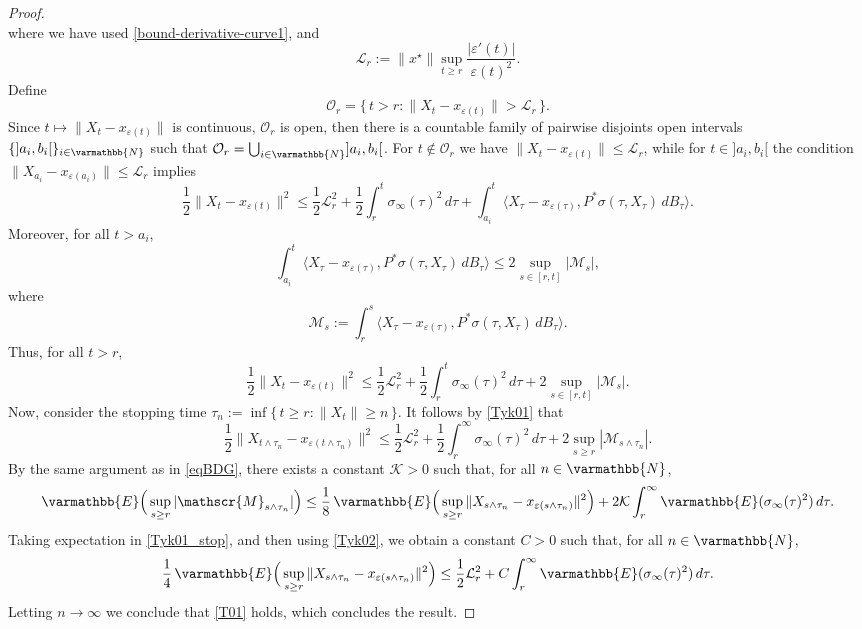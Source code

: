 \documentclass[11pt,reqno]{article}
\let\mathbb=\varmathbb
\newcommand{\N}{\mathbb{N}}
\renewcommand{\epsilon}{\varepsilon}
\newcommand{\1}{\mathds{1}}
\numberwithin{equation}{section}  %
\theoremstyle{plain}
\theoremstyle{definition}
\theoremstyle{remark}
\numberwithin{theorem}{section}
\numberwithin{remark}{section}
\numberwithin{example}{section}
\begin{document}
\begin{proof}
\begin{equation*}
	\end{equation*}
	where we have used \eqref{bound-derivative-curve1}, and
	\[
	\mathcal{L}_{r} := \|x^\star\| \sup_{t\geq r}\frac{|\epsilon'(t)|}{\epsilon(t)^2}.
	\]
	Define
	\[
	\mathcal{O}_r= \{\,t>r : \|X_t-x_{\epsilon(t)}\| > \mathcal{L}_{r} \,\}.
	\]
	Since $t \mapsto \|X_t-x_{\epsilon(t)}\|$ is continuous, $\mathcal{O}_r$ is open, then there is a countable family of pairwise disjoints open intervals $\{]a_i,b_i[\}_{i\in \N}$ such that $\mathcal{O}_r = \bigcup_{i\in \N}]a_i,b_i[$.  
	For $t\notin \mathcal{O}_r$ we have $\|X_t-x_{\epsilon(t)}\|\leq \mathcal{L}_{r}$, while for $t\in ]a_i,b_i[$ the condition $\|X_{a_i}-x_{\epsilon(a_i)}\|\leq \mathcal{L}_{r}$ implies
	\begin{equation*}
		\frac{1}{2}\|X_t-x_{\epsilon(t)}\|^2
		\leq \frac{1}{2}\mathcal{L}_{r}^2 
		+ \frac{1}{2}\int_{r}^t \sigma_\infty(\tau)^2 \, d\tau
		+ \int_{a_i}^t \langle X_\tau-x_{\epsilon(\tau)},P^\ast\sigma(\tau,X_\tau)\, dB_\tau \rangle .
	\end{equation*}
	Moreover, for all $t>a_i$,
	\[
	\int_{a_i}^t \langle X_\tau-x_{\epsilon(\tau)},P^\ast\sigma(\tau,X_\tau)\, dB_\tau \rangle 
	\leq 2 \sup_{s\in [r, t]} |\mathscr{M}_s|,
	\]
	where
	\[
	\mathscr{M}_s := \int_{r}^s \langle X_\tau-x_{\epsilon(\tau)},P^\ast\sigma(\tau,X_\tau)\, dB_\tau \rangle.
	\]
	Thus, for all $t>r$,
	\begin{equation}\label{Tyk01}
		\frac{1}{2}\|X_t-x_{\epsilon(t)}\|^2
		\leq \frac{1}{2}\mathcal{L}_{r}^2 
		+ \frac{1}{2}\int_{r}^t \sigma_\infty(\tau)^2 \, d\tau
		+ 2 \sup_{s\in [r,t]} |\mathscr{M}_s|.
	\end{equation}
	Now, consider the stopping time $\tau_n := \inf\{\,t\geq r : \|X_t\|\geq n \,\}$.  It follows by \eqref{Tyk01} that 
	\begin{equation}\label{Tyk01_stop}
			\frac{1}{2}\|X_{t\wedge \tau_n}-x_{\epsilon(t\wedge \tau_n)}\|^2
			\leq \frac{1}{2}\mathcal{L}_{r}^2 
			+ \frac{1}{2}\int_{r}^\infty \sigma_\infty(\tau)^2 \, d\tau
			+ 2 \sup_{s\geq r} |\mathscr{M}_{s\wedge \tau_n} |.
		\end{equation}
	By the same argument as in \eqref{eqBDG}, there exists a constant $\mathcal{K}>0$ such that, for all $n\in\N$,
	\begin{equation}\label{Tyk02}
		\mathbb{E}\Big(\sup_{s \geq r} |\mathscr{M}_{s\wedge\tau_n}|\Big) 
		\leq \frac{1}{8}\,\mathbb{E}\Big(\sup_{s\geq r}\|X_{s\wedge\tau_n}-x_{\epsilon(s\wedge\tau_n)}\|^2\Big) 
		+ 2 \mathcal{K} \int_{r}^\infty \mathbb{E}(\sigma_\infty(\tau)^2) \, d\tau.
	\end{equation}
	Taking expectation in  \eqref{Tyk01_stop},  and then using \eqref{Tyk02}, we obtain a constant $C>0$ such that, for all $n\in\N$,
	\begin{equation*}
		\frac{1}{4}\, \mathbb{E}\Big(\sup_{s\geq r}\|X_{s\wedge\tau_n}-x_{\epsilon(s\wedge\tau_n)}\|^2\Big) 
		\leq \frac{1}{2} \mathcal{L}_{r}^2 + C\int_{r}^\infty \mathbb{E}(\sigma_\infty(\tau)^2) \, d\tau.
	\end{equation*}
    Letting $n\to\infty$ we conclude that \eqref{T01}  holds,   which concludes the result.
\end{proof}
\end{document}
